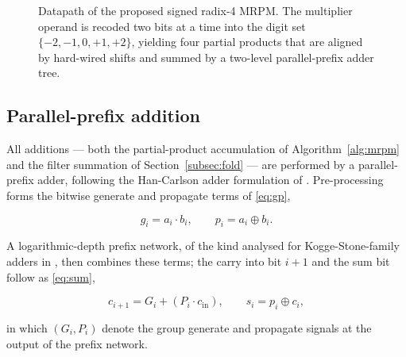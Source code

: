 \documentclass[conference]{IEEEtran}
\begin{document}
\begin{figure}[t]
\caption{Datapath of the proposed signed radix-4 MRPM. The multiplier
operand is recoded two bits at a time into the digit set
$\{-2,-1,0,+1,+2\}$, yielding four partial products that are aligned by
hard-wired shifts and summed by a two-level parallel-prefix adder tree.}
\label{fig:mrpm}
\end{figure}

\subsection{Parallel-prefix addition}
\label{subsec:hc}

All additions --- both the partial-product accumulation of
Algorithm~\ref{alg:mrpm} and the filter summation of
Section~\ref{subsec:fold} --- are performed by a parallel-prefix adder,
following the Han-Carlson adder formulation of \cite{rao}.
Pre-processing forms the bitwise generate and propagate terms of
\eqref{eq:gp},

\begin{equation}
g_i = a_i \cdot b_i, \qquad p_i = a_i \oplus b_i .
\label{eq:gp}
\end{equation}

\noindent A logarithmic-depth prefix network, of the kind analysed for
Kogge-Stone-family adders in \cite{penchalaiah,raju}, then combines
these terms; the carry into bit $i+1$ and the sum bit follow as
\eqref{eq:sum},

\begin{equation}
c_{i+1} = G_i + (P_i \cdot c_{\mathrm{in}}), \qquad
s_i = p_i \oplus c_i ,
\label{eq:sum}
\end{equation}

\noindent in which $(G_i, P_i)$ denote the group generate and propagate
signals at the output of the prefix network.
\end{document}
